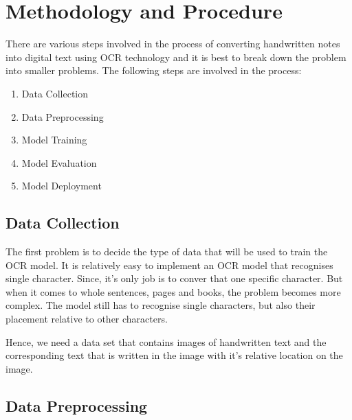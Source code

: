 \documentclass[twoside,a4paper]{article}
\begin{document}
\section{Methodology and Procedure}
There are various steps involved in the process of converting handwritten notes into digital text using OCR technology and it is best to break down the problem into smaller problems.
The following steps are involved in the process:
\begin{enumerate}
    \item Data Collection
    \item Data Preprocessing
    \item Model Training
    \item Model Evaluation
    \item Model Deployment
\end{enumerate}

\subsection{Data Collection}
The first problem is to decide the type of data that will be used to train the OCR model. It is relatively easy to implement an OCR model that recognises single character. Since, it's only job is to conver that one specific character.
But when it comes to whole sentences, pages and books, the problem becomes more complex. The model still has to recognise single characters, but also their placement relative to other characters.

Hence, we need a data set that contains images of handwritten text and the corresponding text that is written in the image with it's relative location on the image. 


\subsection{Data Preprocessing}
\end{document}
